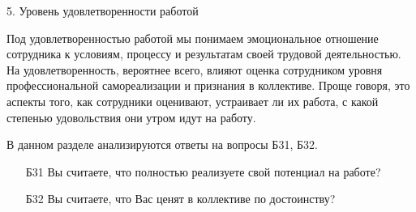 \begin{frame}{5. Уровень удовлетворенности работой}

\tiny
Под удовлетворенностью работой мы понимаем эмоциональное отношение сотрудника к условиям, процессу и результатам своей трудовой деятельностью. На удовлетворенность, вероятнее всего, влияют оценка сотрудником уровня профессиональной самореализации и  признания в коллективе. Проще говоря, это аспекты того, как сотрудники оценивают, устраивает ли их работа, с какой степенью удовольствия они утром идут на работу. 
\bigskip

В данном разделе анализируются ответы на вопросы Б31, Б32.
\bigskip

\begin{itemize}

\item [Б31] Вы считаете, что полностью реализуете свой потенциал на работе?

\item [Б32] Вы считаете, что Вас ценят в коллективе по достоинству?

\end{itemize}

\end{frame}


